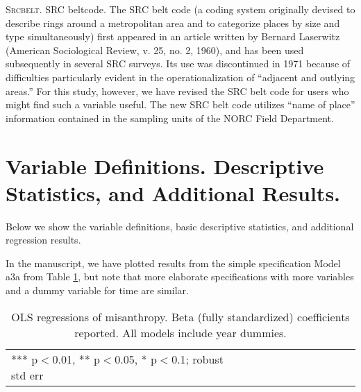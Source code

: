 \documentclass[11pt, letterpaper]{article}
\begin{document}
\begin{spacing}{1.4}
\textsc{Srcbelt}. SRC beltcode. The SRC belt code (a coding system originally devised to describe
rings around a metropolitan area and to categorize places by size
and type simultaneously) first appeared in an article written by
Bernard Laserwitz (American Sociological Review, v. 25, no. 2, 1960),
and has been used subsequently in several SRC surveys.
Its use was discontinued in 1971 because of difficulties particularly
evident in the operationalization of ``adjacent and outlying areas.''
For this study, however, we have revised the SRC belt code for users
who might find such a variable useful. The new SRC belt code utilizes
``name of place'' information contained in the sampling units
of the NORC Field Department.
    
\section{Variable Definitions. Descriptive Statistics, and Additional Results.}    
    
Below we show the variable definitions, basic descriptive statistics, and additional regression results.
{\footnotesize


}
 
 
 
 

\clearpage
In the manuscript, we have plotted results from the simple specification Model a3a
from Table \ref{regDbyHand}, but note that more elaborate specifications with
more variables and a dummy variable for time are similar.

 \begin{spacing}{.67}
\begin{table}[H]\centering
\caption{OLS regressions  of misanthropy. Beta (fully standardized) coefficients
  reported. All models include year dummies.} \label{regDbyHand}
\begin{tiny} \begin{tabular}{p{1.2in}p{.45in}p{.45in}p{.45in}p{.45in}p{.45in}p{.45in}p{.45in}p{.45in}p{.45in}p{.45 in}}\hline
 \hline  *** p$<$0.01, ** p$<$0.05, * p$<$0.1; robust std err
\end{tabular}\end{tiny}\end{table}
 \end{spacing}


\end{spacing}
\end{document}
